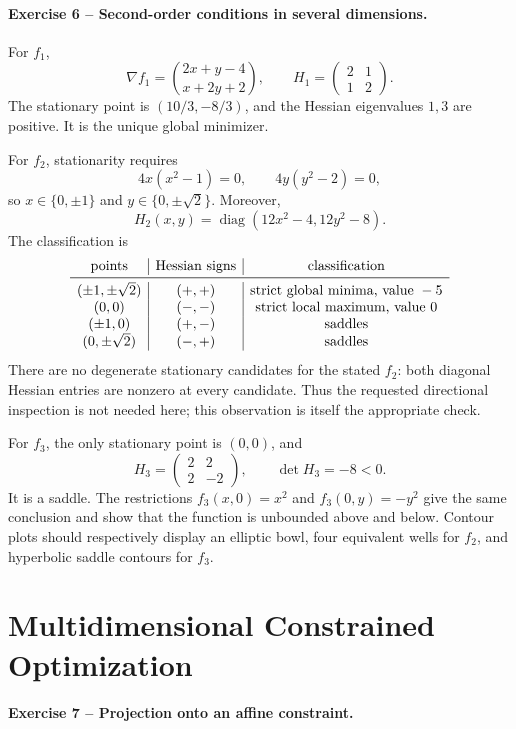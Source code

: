 \documentclass[10pt]{article}
\newcommand{\diag}{\operatorname{diag}}
\begin{document}
\paragraph{Exercise 6 -- Second-order conditions in several dimensions.}

For \(f_1\),
\[
\nabla f_1=\binom{2x+y-4}{x+2y+2},
\qquad
H_1=\begin{pmatrix}2&1\\1&2\end{pmatrix}.
\]
The stationary point is
\((10/3,-8/3)\), and the Hessian eigenvalues \(1,3\) are positive. It is the
unique global minimizer.

For \(f_2\), stationarity requires
\[
4x(x^2-1)=0,
\qquad
4y(y^2-2)=0,
\]
so \(x\in\{0,\pm1\}\) and \(y\in\{0,\pm\sqrt2\}\). Moreover,
\[
H_2(x,y)=\diag(12x^2-4,12y^2-8).
\]
The classification is
\[
\begin{array}{c|c|c}
\text{points}&\text{Hessian signs}&\text{classification}\\ \midrule
(\pm1,\pm\sqrt2)&(+,+)&\text{strict global minima, value }-5\\
(0,0)&(-,-)&\text{strict local maximum, value }0\\
(\pm1,0)&(+,-)&\text{saddles}\\
(0,\pm\sqrt2)&(-,+)&\text{saddles}
\end{array}
\]
There are no degenerate stationary candidates for the stated \(f_2\): both
diagonal Hessian entries are nonzero at every candidate. Thus the requested
directional inspection is not needed here; this observation is itself the
appropriate check.

For \(f_3\), the only stationary point is \((0,0)\), and
\[
H_3=\begin{pmatrix}2&2\\2&-2\end{pmatrix},
\qquad \det H_3=-8<0.
\]
It is a saddle. The restrictions \(f_3(x,0)=x^2\) and
\(f_3(0,y)=-y^2\) give the same conclusion and show that the function is
unbounded above and below. Contour plots should respectively display an
elliptic bowl, four equivalent wells for \(f_2\), and hyperbolic saddle
contours for \(f_3\).

\section{Multidimensional Constrained Optimization}

\paragraph{Exercise 7 -- Projection onto an affine constraint.}
\end{document}
